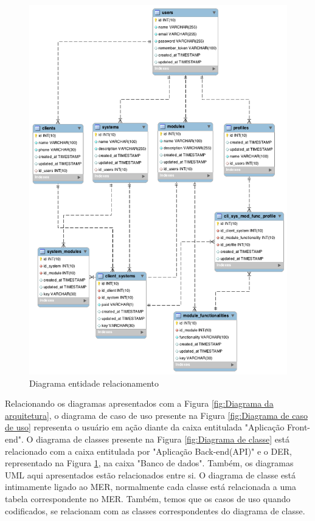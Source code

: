 \begin{figure}
	\includegraphics[width=1\textwidth]{images/DER}
	\caption{Diagrama entidade relacionamento}
    \label{fig:DER}
\end{figure}


Relacionando os diagramas apresentados com a Figura \ref{fig:Diagrama da arquitetura}, o diagrama de caso de uso presente na Figura \ref{fig:Diagrama de caso de uso} representa o usuário em ação diante da caixa entitulada "Aplicação Front-end". O diagrama de classes presente na Figura \ref{fig:Diagrama de classe} está relacionado com a caixa entitulada por "Aplicação Back-end(API)" e o DER, representado na Figura \ref{fig:DER}, na caixa "Banco de dados". 
Também, os diagramas UML aqui apresentados estão relacionados entre si. O diagrama de classe está intimamente ligado ao MER, normalmente cada classe está relacionada a uma tabela correspondente no MER. Também, temos que os casos de uso quando codificados, se relacionam com as classes correspondentes do diagrama de classe.


